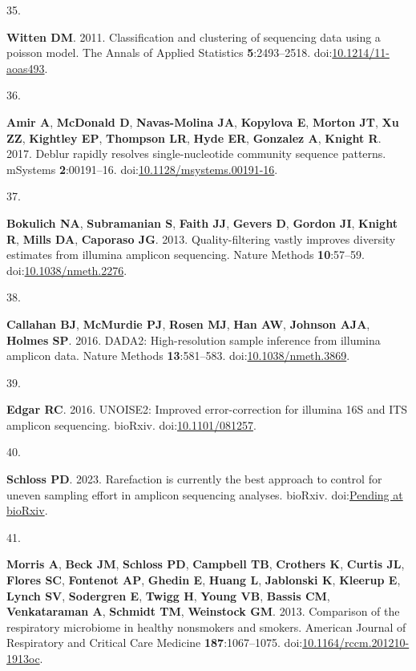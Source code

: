 \documentclass[
]{article}
\newlength{\cslhangindent}
\newlength{\csllabelwidth}
\newlength{\cslentryspacingunit} %
\newenvironment{CSLReferences}[2] %
 {%
  \setlength{\parindent}{0pt}
  \ifodd #1
  \let\oldpar\par
  \def\par{\hangindent=\cslhangindent\oldpar}
  \fi
  \setlength{\parskip}{#2\cslentryspacingunit}
 }%
 {}
\newcommand{\CSLLeftMargin}[1]{\parbox[t]{\csllabelwidth}{#1}}
\newcommand{\CSLRightInline}[1]{\parbox[t]{\linewidth - \csllabelwidth}{#1}\break}
\begin{document}
\begin{CSLReferences}{0}{1}
\leavevmode{}%
\CSLLeftMargin{35. }%
\CSLRightInline{\textbf{Witten DM}. 2011. Classification and clustering
of sequencing data using a poisson model. The Annals of Applied
Statistics \textbf{5}:2493--2518.
doi:\href{https://doi.org/10.1214/11-aoas493}{10.1214/11-aoas493}.}

\leavevmode{}%
\CSLLeftMargin{36. }%
\CSLRightInline{\textbf{Amir A}, \textbf{McDonald D},
\textbf{Navas-Molina JA}, \textbf{Kopylova E}, \textbf{Morton JT},
\textbf{Xu ZZ}, \textbf{Kightley EP}, \textbf{Thompson LR}, \textbf{Hyde
ER}, \textbf{Gonzalez A}, \textbf{Knight R}. 2017. Deblur rapidly
resolves single-nucleotide community sequence patterns. {mSystems}
\textbf{2}:00191--16.
doi:\href{https://doi.org/10.1128/msystems.00191-16}{10.1128/msystems.00191-16}.}

\leavevmode{}%
\CSLLeftMargin{37. }%
\CSLRightInline{\textbf{Bokulich NA}, \textbf{Subramanian S},
\textbf{Faith JJ}, \textbf{Gevers D}, \textbf{Gordon JI}, \textbf{Knight
R}, \textbf{Mills DA}, \textbf{Caporaso JG}. 2013. Quality-filtering
vastly improves diversity estimates from illumina amplicon sequencing.
Nature Methods \textbf{10}:57--59.
doi:\href{https://doi.org/10.1038/nmeth.2276}{10.1038/nmeth.2276}.}

\leavevmode{}%
\CSLLeftMargin{38. }%
\CSLRightInline{\textbf{Callahan BJ}, \textbf{McMurdie PJ},
\textbf{Rosen MJ}, \textbf{Han AW}, \textbf{Johnson AJA}, \textbf{Holmes
SP}. 2016. {DADA}2: High-resolution sample inference from illumina
amplicon data. Nature Methods \textbf{13}:581--583.
doi:\href{https://doi.org/10.1038/nmeth.3869}{10.1038/nmeth.3869}.}

\leavevmode{}%
\CSLLeftMargin{39. }%
\CSLRightInline{\textbf{Edgar RC}. 2016. {UNOISE}2: Improved
error-correction for illumina 16S and {ITS} amplicon sequencing.
bio{R}xiv. doi:\href{https://doi.org/10.1101/081257}{10.1101/081257}.}

\leavevmode{}%
\CSLLeftMargin{40. }%
\CSLRightInline{\textbf{Schloss PD}. 2023. Rarefaction is currently the
best approach to control for uneven sampling effort in amplicon
sequencing analyses. bio{R}xiv.
doi:\href{https://doi.org/Pending\%20at\%20bioRxiv}{Pending at
bioRxiv}.}

\leavevmode{}%
\CSLLeftMargin{41. }%
\CSLRightInline{\textbf{Morris A}, \textbf{Beck JM}, \textbf{Schloss
PD}, \textbf{Campbell TB}, \textbf{Crothers K}, \textbf{Curtis JL},
\textbf{Flores SC}, \textbf{Fontenot AP}, \textbf{Ghedin E},
\textbf{Huang L}, \textbf{Jablonski K}, \textbf{Kleerup E},
\textbf{Lynch SV}, \textbf{Sodergren E}, \textbf{Twigg H}, \textbf{Young
VB}, \textbf{Bassis CM}, \textbf{Venkataraman A}, \textbf{Schmidt TM},
\textbf{Weinstock GM}. 2013. Comparison of the respiratory microbiome in
healthy nonsmokers and smokers. American Journal of Respiratory and
Critical Care Medicine \textbf{187}:1067--1075.
doi:\href{https://doi.org/10.1164/rccm.201210-1913oc}{10.1164/rccm.201210-1913oc}.}


\end{CSLReferences}
\end{document}
